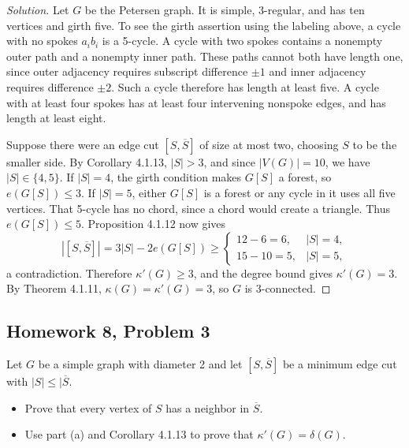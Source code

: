 \documentclass[12pt]{amsart}
\newenvironment{solution}{\begin{proof}[Solution]}{\end{proof}}
\begin{document}
    \begin{solution}

        Let $G$ be the Petersen graph. It is simple, 3-regular, and has
        ten vertices and girth five. To see the girth assertion using the
        labeling above, a cycle with no spokes $a_i b_i$ is a 5-cycle.
        A cycle with two spokes contains a nonempty outer path and a
        nonempty inner path. These paths cannot both have length one,
        since outer adjacency requires subscript difference $\pm1$ and
        inner adjacency requires difference $\pm2$. Such a cycle therefore
        has length at least five. A cycle with at least four spokes has
        at least four intervening nonspoke edges, and has length at least eight.

        Suppose there were an edge cut $[S,\overline S]$ of size at most
        two, choosing $S$ to be the smaller side. By Corollary 4.1.13,
        $|S|>3$, and since $|V(G)|=10$, we have $|S|\in\{4,5\}$.
        If $|S|=4$, the girth condition makes $G[S]$ a forest, so
        $e(G[S])\le3$. If $|S|=5$, either $G[S]$ is a forest or any
        cycle in it uses all five vertices. That 5-cycle has no chord,
        since a chord would create a triangle. Thus $e(G[S])\le5$.
        Proposition 4.1.12 now gives
        \[
            |[S,\overline S]|=3|S|-2e(G[S])\ge
            \begin{cases}
                12-6=6,&|S|=4,\\
                15-10=5,&|S|=5,
            \end{cases}
        \]
        a contradiction. Therefore $\kappa'(G)\ge3$, and the degree
        bound gives $\kappa'(G)=3$. By Theorem 4.1.11,
        $\kappa(G)=\kappa'(G)=3$, so $G$ is 3-connected.
    \end{solution}

    \subsection*{Homework 8, Problem 3} Let $G$ be a simple graph with diameter 2 and let $[S, \overline{S}]$ be a
    minimum edge cut with $|S|\le |\overline{S}$.
    \begin{itemize}
        \item[(a)] Prove that every vertex of $S$ has a neighbor in $\overline{S}$.
        \item[(b)] Use part (a) and Corollary 4.1.13 to prove that $\kappa'(G) = \delta(G)$.
    \end{itemize}
\end{document}
